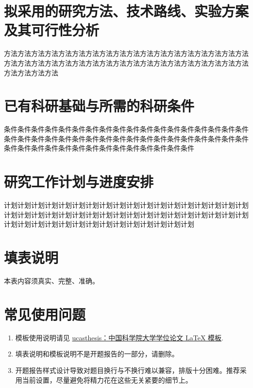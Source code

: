 \section{拟采用的研究方法、技术路线、实验方案及其可行性分析}

方法方法方法方法方法方法方法方法方法方法方法方法方法方法方法方法方法方法方法方法方法方法方法方法方法方法方法方法方法方法方法方法方法方法方法方法方法方法方法方法

\section{已有科研基础与所需的科研条件}

条件条件条件条件条件条件条件条件条件条件条件条件条件条件条件条件条件条件条件条件条件条件条件条件条件条件条件条件条件条件条件条件条件条件条件条件条件条件条件条件条件条件条件条件条件条件条件条件条件条件

\section{研究工作计划与进度安排}

计划计划计划计划计划计划计划计划计划计划计划计划计划计划计划计划计划计划计划计划计划计划计划计划计划计划计划计划计划计划计划计划计划计划计划计划计划计划计划计划计划计划计划计划计划计划计划计划计划计划

\section*{填表说明}

本表内容须真实、完整、准确。

\section*{常见使用问题}

\begin{enumerate}
    \item 模板使用说明请见 \href{https://github.com/mohuangrui/ucasthesis}{ucasthesis：中国科学院大学学位论文 LaTeX 模板}.
    \item 填表说明和模板说明不是开题报告的一部分，请删除。
    \item 开题报告样式设计导致对题目换行与不换行难以兼容，排版十分困难。推荐采用当前设置，尽量避免将精力花在这些无关紧要的细节上。
\end{enumerate}

\nocite{*}%
